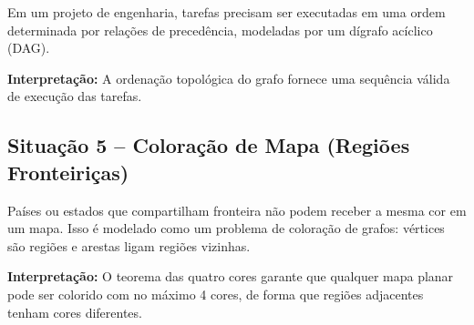 \documentclass[12pt,a4paper]{article}
\begin{document}
Em um projeto de engenharia, tarefas precisam ser executadas em uma ordem determinada por relações de precedência, modeladas por um dígrafo acíclico (DAG).

\begin{center}
\end{center}

\noindent\textbf{Interpretação:} A ordenação topológica do grafo fornece uma sequência válida de execução das tarefas.

\subsection{Situação 5 -- Coloração de Mapa (Regiões Fronteiriças)}

Países ou estados que compartilham fronteira não podem receber a mesma cor em um mapa. Isso é modelado como um problema de coloração de grafos: vértices são regiões e arestas ligam regiões vizinhas.

\begin{center}
\end{center}

\noindent\textbf{Interpretação:} O teorema das quatro cores garante que qualquer mapa planar pode ser colorido com no máximo 4 cores, de forma que regiões adjacentes tenham cores diferentes.

\newpage

\end{document}
